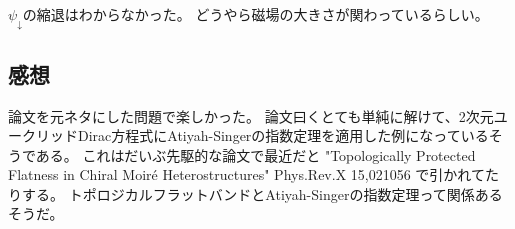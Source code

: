 \documentclass[../../sp_2015.tex]{subfiles}
\begin{document}
\(\psi_\downarrow\)の縮退はわからなかった。
どうやら磁場の大きさが関わっているらしい。

\subsection*{感想}
論文を元ネタにした問題で楽しかった。
論文曰くとても単純に解けて、2次元ユークリッドDirac方程式にAtiyah-Singerの指数定理を適用した例になっているそうである。
これはだいぶ先駆的な論文で最近だと "Topologically Protected Flatness in Chiral Moir\'{e} Heterostructures" Phys.Rev.X 15,021056
で引かれてたりする。
トポロジカルフラットバンドとAtiyah-Singerの指数定理って関係あるそうだ。
\end{document}
